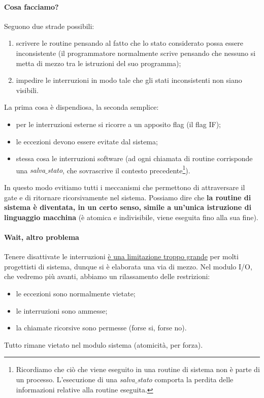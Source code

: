 \documentclass[11pt]{report}
\theoremstyle{definition}
\begin{document}
\paragraph{Cosa facciamo?} Seguono due strade possibili:
\begin{enumerate}
\item scrivere le routine pensando al fatto che lo stato considerato possa essere inconsistente (il programmatore normalmente scrive pensando che nessuno si metta di mezzo tra le istruzioni del suo programma);
\item impedire le interruzioni in modo tale che gli stati inconsistenti non siano visibili.
\end{enumerate}
La prima cosa è dispendiosa, la seconda semplice:
\begin{itemize}
	\item per le interruzioni esterne si ricorre a un apposito flag (il flag IF);
	\item le eccezioni devono essere evitate dal sistema;
	\item stessa cosa le interruzioni software (ad ogni chiamata di routine corrisponde una \emph{salva$\_$stato}, che sovrascrive il contesto precedente\footnote{Ricordiamo che ciò che viene eseguito in una routine di sistema non è parte di un processo. L'esecuzione di una \emph{salva$\_$stato} comporta la perdita delle informazioni relative alla routine eseguita.}).
\end{itemize}
 In questo modo evitiamo tutti i meccanismi che permettono di attraversare il gate e di ritornare ricorsivamente nel sistema. Possiamo dire che \textbf{la routine di sistema è diventata, in un certo senso, simile a un'unica istruzione di linguaggio macchina} (è atomica e indivisibile, viene eseguita fino alla sua fine). 

\paragraph{Wait, altro problema} Tenere disattivate le interruzioni \underline{è una limitazione troppo grande} per molti progettisti di sistema, dunque si è elaborata una via di mezzo. Nel modulo I/O, che vedremo più avanti, abbiamo un rilassamento delle restrizioni:
\begin{itemize}
	\item le eccezioni sono normalmente vietate;
	\item le interruzioni sono ammesse;
	\item la chiamate ricorsive sono permesse (forse si, forse no).
\end{itemize}
Tutto rimane vietato nel modulo sistema (atomicità, per forza).
\end{document}
